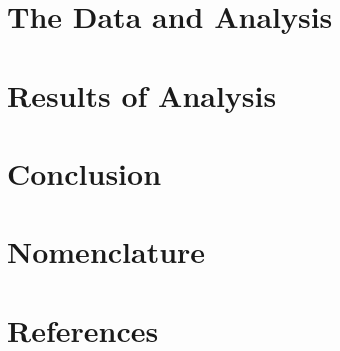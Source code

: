 \documentclass[letterpaper,12pt]{article}
\begin{document}
\section{The Data and Analysis}




\section{Results of Analysis}




\section{Conclusion}




\section{Nomenclature}



\section{References}
\end{document}
